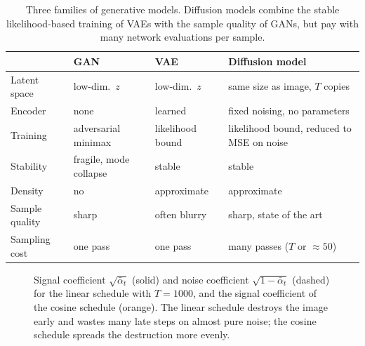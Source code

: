 \begin{table}[ht]
  \centering
  \begin{tabular}{@{}p{2.6cm}p{3.6cm}p{3.6cm}p{3.9cm}@{}}
    \toprule
    & GAN & VAE & Diffusion model \\
    \midrule
    Latent space & low-dim.\ $z$ & low-dim.\ $z$ & same size as image,
      $T$ copies \\
    Encoder & none & learned & fixed noising, no parameters \\
    Training & adversarial minimax & likelihood bound & likelihood bound,
      reduced to MSE on noise \\
    Stability & fragile, mode collapse & stable & stable \\
    Density & no & approximate & approximate \\
    Sample quality & sharp & often blurry & sharp, state of the art \\
    Sampling cost & one pass & one pass & many passes ($T$ or ${\approx}50$) \\
    \bottomrule
  \end{tabular}
  \caption{Three families of generative models. Diffusion models combine the
  stable likelihood-based training of VAEs with the sample quality of GANs,
  but pay with many network evaluations per sample.}
  \label{tab:diff-vs-gan-vae}
\end{table}

\begin{figure}[ht]
  \centering
  \caption{Signal coefficient $\sqrt{\bar\alpha_t}$ (solid) and noise
  coefficient $\sqrt{1-\bar\alpha_t}$ (dashed) for the linear schedule with
  $T=1000$, and the signal coefficient of the cosine schedule (orange). The
  linear schedule destroys the image early and wastes many late steps on
  almost pure noise; the cosine schedule spreads the destruction more
  evenly.}
  \label{fig:diff-schedule}
\end{figure}

